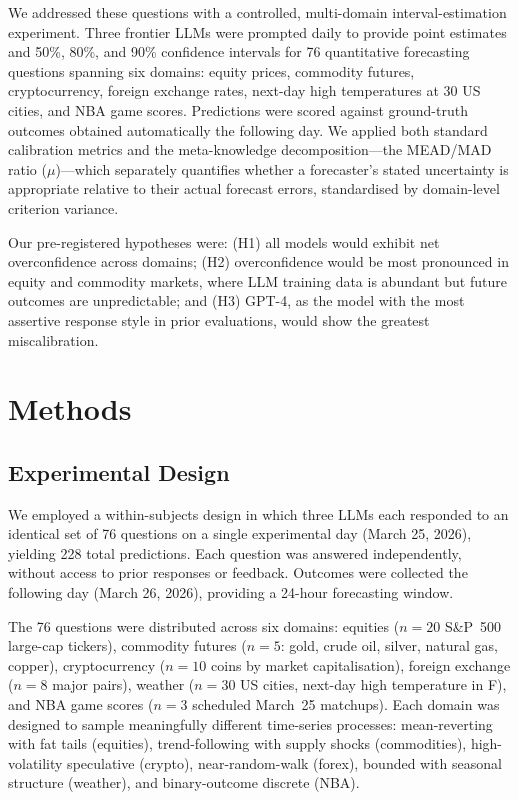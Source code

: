 \documentclass[9pt,twoside,lineno]{pnas-new}
\begin{document}
We addressed these questions with a controlled, multi-domain interval-estimation experiment. Three frontier LLMs were prompted daily to provide point estimates and 50\%, 80\%, and 90\% confidence intervals for 76 quantitative forecasting questions spanning six domains: equity prices, commodity futures, cryptocurrency, foreign exchange rates, next-day high temperatures at 30 US cities, and NBA game scores. Predictions were scored against ground-truth outcomes obtained automatically the following day. We applied both standard calibration metrics and the \citet{soll2004} meta-knowledge decomposition---the MEAD/MAD ratio ($\mu$)---which separately quantifies whether a forecaster's stated uncertainty is appropriate relative to their actual forecast errors, standardised by domain-level criterion variance.

Our pre-registered hypotheses were: (H1) all models would exhibit net overconfidence across domains; (H2) overconfidence would be most pronounced in equity and commodity markets, where LLM training data is abundant but future outcomes are unpredictable; and (H3) GPT-4, as the model with the most assertive response style in prior evaluations, would show the greatest miscalibration.

\section*{Methods}

\subsection*{Experimental Design}

We employed a within-subjects design in which three LLMs each responded to an identical set of 76 questions on a single experimental day (March 25, 2026), yielding 228 total predictions. Each question was answered independently, without access to prior responses or feedback. Outcomes were collected the following day (March 26, 2026), providing a 24-hour forecasting window.

The 76 questions were distributed across six domains: equities ($n=20$ S\&P~500 large-cap tickers), commodity futures ($n=5$: gold, crude oil, silver, natural gas, copper), cryptocurrency ($n=10$ coins by market capitalisation), foreign exchange ($n=8$ major pairs), weather ($n=30$ US cities, next-day high temperature in \textdegree F), and NBA game scores ($n=3$ scheduled March~25 matchups). Each domain was designed to sample meaningfully different time-series processes: mean-reverting with fat tails (equities), trend-following with supply shocks (commodities), high-volatility speculative (crypto), near-random-walk (forex), bounded with seasonal structure (weather), and binary-outcome discrete (NBA).
\end{document}
